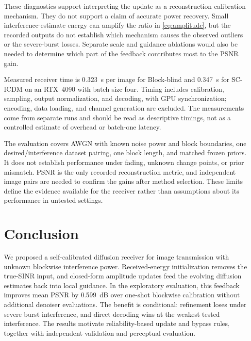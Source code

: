 \documentclass[conference]{IEEEtran}
\newcommand{\method}{SC-ICDM}
\begin{document}
These diagnostics support interpreting the update as a reconstruction
calibration mechanism. They do not support a claim of accurate power
recovery. Small interference-estimate energy can amplify the ratio in
\eqref{eq:amplitude}, but the recorded outputs do not establish which
mechanism causes the observed outliers or the severe-burst losses.
Separate scale and guidance ablations would also be needed to determine
which part of the feedback contributes most to the PSNR gain.

\balance
Measured receiver time is 0.323~s per image for Block-blind and 0.347~s
for \method{} on an RTX~4090 with batch size four. Timing includes
calibration, sampling, output normalization, and decoding, with GPU
synchronization; encoding, data loading, and channel generation are excluded.
The measurements come from separate runs and should be read as descriptive
timings, not as a controlled estimate of overhead or batch-one latency.

The evaluation covers AWGN with known noise power and block boundaries,
one desired/interference dataset pairing, one block length, and matched
frozen priors. It does not establish performance under fading, unknown
change points, or prior mismatch. PSNR is the only recorded reconstruction
metric, and independent image pairs are needed to confirm the gains after
method selection. These limits define the evidence available for the
receiver rather than assumptions about its performance in untested settings.

\section{Conclusion}

We proposed a self-calibrated diffusion receiver for image transmission
with unknown blockwise interference power. Received-energy initialization
removes the true-SINR input, and closed-form amplitude updates feed the
evolving diffusion estimates back into local guidance. In the exploratory
evaluation, this feedback improves mean PSNR by 0.599~dB over one-shot
blockwise calibration without additional denoiser evaluations.
The benefit is conditional: refinement loses under severe burst
interference, and direct decoding wins at the weakest tested interference.
The results motivate reliability-based update and bypass rules, together
with independent validation and perceptual evaluation.

\begingroup


\endgroup
\end{document}
